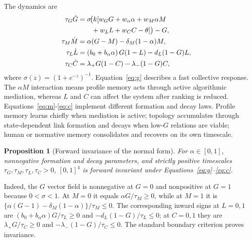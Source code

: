 \documentclass[10pt,a4paper]{article}
\newtheorem{proposition}{Proposition}
\begin{document}
The dynamics are
\begin{align}
\tau_G\dot G
  &=\sigma\!\bigl(k[w_GG+w_\alpha\alpha+w_M\alpha M \notag\\
  &\qquad {}+w_LL+w_CC-\theta]\bigr)-G, \label{eq:g}\\
\tau_M\dot M & = \alpha(G-M)-\delta_M(1-\alpha)M, \label{eq:m}\\
\tau_L\dot L & = \left(b_0+b_\alpha\alpha\right)G(1-L)-d_L(1-G)L, \label{eq:l}\\
\tau_C\dot C & = \lambda_+G(1-C)-\lambda_-(1-G)C, \label{eq:c}
\end{align}
where $\sigma(z)=(1+e^{-z})^{-1}$. Equation~\eqref{eq:g} describes a fast collective response. The $\alpha M$ interaction means profile memory acts through active algorithmic mediation, whereas $L$ and $C$ can affect the system after ranking is reduced. Equations~\eqref{eq:m}-\eqref{eq:c} implement different formation and decay laws. Profile memory learns chiefly when mediation is active; topology accumulates through state-dependent link formation and decays when low-$G$ relations are viable; human or normative memory consolidates and recovers on its own timescale.

\begin{proposition}[Forward invariance of the normal form]
\label{prop:forward-invariance}
For $\alpha\in[0,1]$, nonnegative formation and decay parameters, and strictly positive timescales $\tau_G,\tau_M,\tau_L,\tau_C>0$, $[0,1]^4$ is forward invariant under Equations~\eqref{eq:g}--\eqref{eq:c}.
\end{proposition}
Indeed, the $G$ vector field is nonnegative at $G=0$ and nonpositive at $G=1$ because $0<\sigma<1$. At $M=0$ it equals $\alpha G/\tau_M\geq0$, while at $M=1$ it is $\{\alpha(G-1)-\delta_M(1-\alpha)\}/\tau_M\leq0$. The corresponding inward signs at $L=0,1$ are $(b_0+b_\alpha\alpha)G/\tau_L\geq0$ and $-d_L(1-G)/\tau_L\leq0$; at $C=0,1$ they are $\lambda_+G/\tau_C\geq0$ and $-\lambda_-(1-G)/\tau_C\leq0$. The standard boundary criterion proves invariance.
\end{document}
